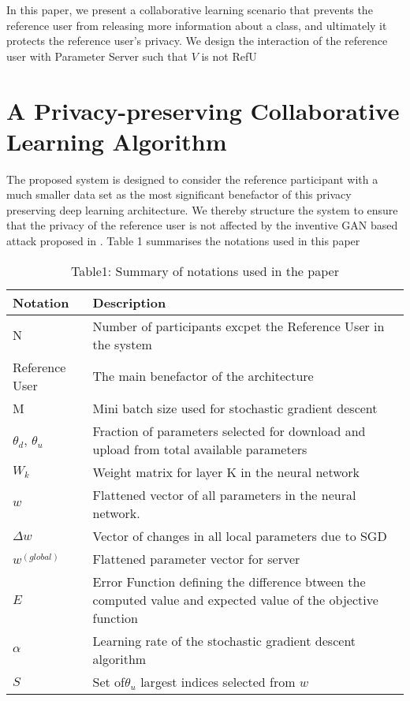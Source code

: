 \documentclass[conference]{IEEEtran}
\begin{document}
In this paper, we present a collaborative learning scenario that prevents the reference user from releasing more
information about a class, and ultimately it protects the reference user's privacy. We design the interaction of the reference user
with Parameter Server such that $V$ is not RefU

\section{A Privacy-preserving Collaborative Learning Algorithm}

The proposed system is designed to consider the reference participant with a much smaller data set as the most significant benefactor
of this privacy preserving deep learning architecture. We thereby structure the system to ensure that the privacy of the reference user
is not affected by the inventive GAN based attack proposed in \cite{hitaj2017deep}. Table 1 summarises the notations used in this paper


\begin{table}[!h]
\centering
\caption{Table1: Summary of notations used in the paper}
\label{table:1}
\begin{tabular}{ | m{} | m{}| } 
\hline
\textbf{Notation} & \textbf{Description} \\
 \hline\hline

N & Number of participants excpet the Reference User in the system\\
\hline
Reference User & The  main benefactor of the architecture \\
\hline
M & Mini batch size used for stochastic gradient descent\\
\hline
$\theta_d$, $\theta_u$ & Fraction of parameters selected for download and upload from total available parameters \\
\hline
$W_k$ & Weight matrix for layer K in the neural network\\
\hline
$w$ & Flattened vector of all parameters in the neural network. \\
\hline
$\Delta w$ & Vector of changes in all local parameters due to SGD\\
\hline
$w^{(global)}$ & Flattened parameter vector for server\\
\hline
$E$ & Error Function defining the difference btween the computed value and expected value of the objective function \\
\hline
$\alpha$ & Learning rate of the stochastic gradient descent algorithm\\
\hline
$S$ & Set of$\theta_u$ largest indices selected from $w$ \\
\hline
\end{tabular}
\end{table}
\end{document}
